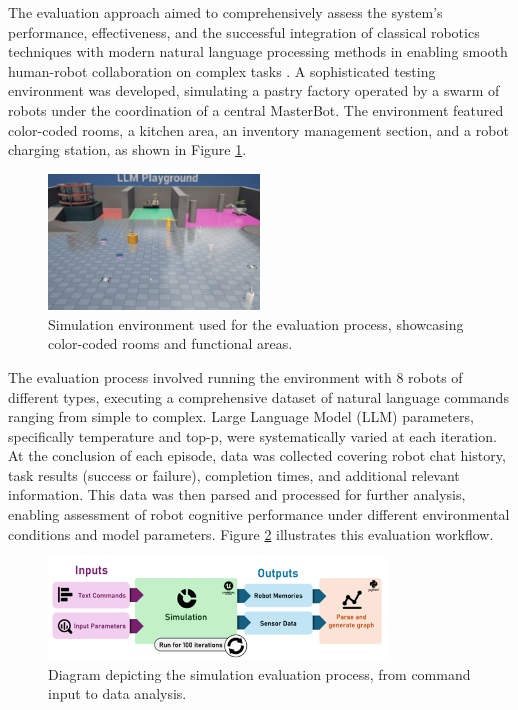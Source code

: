 \documentclass[pdflatex,sn-mathphys-num]{sn-jnl}
\theoremstyle{thmstyleone}
\theoremstyle{thmstyletwo}%
\theoremstyle{thmstylethree}%
\begin{document}
The evaluation approach aimed to comprehensively assess the system's performance, effectiveness, and the successful integration of classical robotics techniques with modern natural language processing methods in enabling smooth human-robot collaboration on complex tasks \cite{kruijff2007incremental}.
A sophisticated testing environment was developed, simulating a pastry factory operated by a swarm of robots under the coordination of a central MasterBot. The environment featured color-coded rooms, a kitchen area, an inventory management section, and a robot charging station, as shown in Figure \ref{simulation_environment}.
\begin{figure}[H]
\centering
\includegraphics[width=0.5\textwidth]{figures/eval_env.png}
\caption{Simulation environment used for the evaluation process, showcasing color-coded rooms and functional areas.}
\label{simulation_environment}
\end{figure}
The evaluation process involved running the environment with 8 robots of different types, executing a comprehensive dataset of natural language commands ranging from simple to complex. Large Language Model (LLM) parameters, specifically temperature and top-p, were systematically varied at each iteration. At the conclusion of each episode, data was collected covering robot chat history, task results (success or failure), completion times, and additional relevant information. This data was then parsed and processed for further analysis, enabling assessment of robot cognitive performance under different environmental conditions and model parameters. Figure \ref{fig:evaluation_process} illustrates this evaluation workflow.
\begin{figure}[H]
\centering
\includegraphics[width=0.8\textwidth]{figures/Picture4.png}
\caption{Diagram depicting the simulation evaluation process, from command input to data analysis.}
\label{fig:evaluation_process}
\end{figure}
\end{document}
